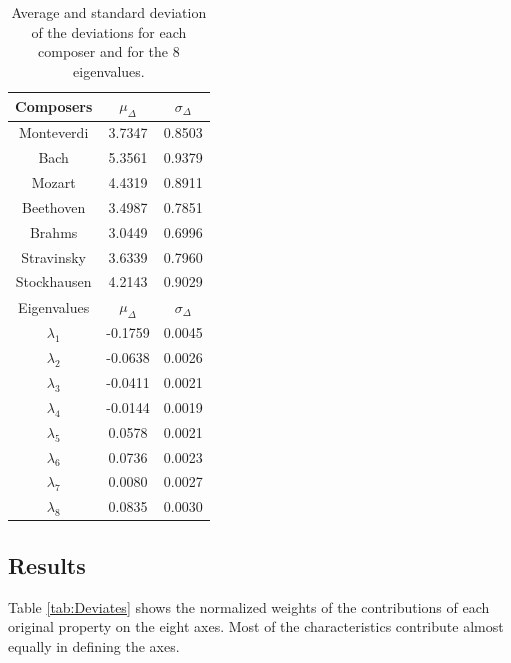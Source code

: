 \documentclass[
 aip,
 jmp,
 amsmath,amssymb,
 reprint,
]{revtex4-1}
\begin{document}
\begin{table}%
\caption{\label{tab:tableD}Average and standard deviation of the 
deviations for each composer and for the 
8 eigenvalues.}

\begin{tabular}{|c||c|c|}
\hline

Composers & $\mu_{\Delta}$ & $\sigma_{\Delta}$ \\
\hline

Monteverdi     & 3.7347 & 0.8503 \\
Bach           & 5.3561 & 0.9379 \\
Mozart         & 4.4319 & 0.8911 \\
Beethoven      & 3.4987 & 0.7851 \\
Brahms         & 3.0449 & 0.6996 \\
Stravinsky     & 3.6339 & 0.7960 \\
Stockhausen    & 4.2143 & 0.9029 \\
\hline \hline
Eigenvalues & $\mu_{\Delta}$ & $\sigma_{\Delta}$ \\
\hline
$\lambda_1$ &  -0.1759 & 0.0045 \\
$\lambda_2$ &  -0.0638 & 0.0026 \\
$\lambda_3$ &  -0.0411 & 0.0021 \\
$\lambda_4$ &  -0.0144 & 0.0019 \\
$\lambda_5$ &   0.0578 & 0.0021 \\
$\lambda_6$ &   0.0736 & 0.0023 \\
$\lambda_7$ &   0.0080 & 0.0027 \\
$\lambda_8$ &   0.0835 & 0.0030 \\
\hline

\end{tabular}
\end{table}

\subsection{Results}

Table \ref{tab:Deviates} shows the normalized weights
of the contributions of each original property on the eight
axes. Most of the characteristics contribute almost equally
in defining the axes. 
\end{document}
